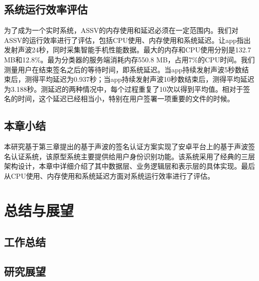 \section{系统运行效率评估}
为了成为一个实时系统，ASSV的内存使用和延迟必须在一定范围内。我们对ASSV的运行效率进行了评估，包括CPU使用、内存使用和系统延迟。让app指出发射声波24秒，同时采集智能手机性能数据。最大的内存和CPU使用分别是132.7 MB和12.8\%。最为分类器的服务端消耗内存550.8 MB，占用7\%的CPU时间。我们测量用户在结束签名之后的等待时间，即系统延迟。当app持续发射声波5秒数结束后，测得平均延迟为0.937秒；当app持续发射声波10秒数结束后，测得平均延迟为3.188秒。测延迟的两种情况中，每个过程重复了10次以得到平均值。相对于签名的时间，这个延迟已经相当小，特别在用户签署一项重要的文件的时候。

\section{本章小结}
本研究基于第三章提出的基于声波的签名认证方案实现了安卓平台上的基于声波签名认证系统，该原型系统主要提供给用户身份识别功能。该系统采用了经典的三层架构设计，本章中详细介绍了其中数据层、业务逻辑层和表示层的具体实现。最后从CPU使用、内存使用和系统延迟方面对系统运行效率进行了评估。

\chapter{总结与展望} 
\section{工作总结}
\section{研究展望}





